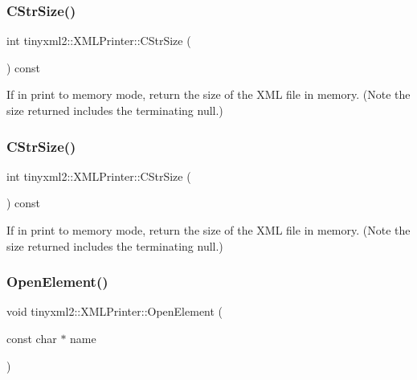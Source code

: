 \subsubsection{\texorpdfstring{C\+Str\+Size()}{CStrSize()}\hspace{0.1cm}{\footnotesize\ttfamily [1/2]}}
{\footnotesize\ttfamily int tinyxml2\+::\+X\+M\+L\+Printer\+::\+C\+Str\+Size (\begin{DoxyParamCaption}{ }\end{DoxyParamCaption}) const\hspace{0.3cm}{\ttfamily [inline]}}

If in print to memory mode, return the size of the X\+ML file in memory. (Note the size returned includes the terminating null.) \mbox{\label{classtinyxml2_1_1XMLPrinter_a3256cf3523d4898b91abb18b924be04c}} 
\subsubsection{\texorpdfstring{C\+Str\+Size()}{CStrSize()}\hspace{0.1cm}{\footnotesize\ttfamily [2/2]}}
{\footnotesize\ttfamily int tinyxml2\+::\+X\+M\+L\+Printer\+::\+C\+Str\+Size (\begin{DoxyParamCaption}{ }\end{DoxyParamCaption}) const\hspace{0.3cm}{\ttfamily [inline]}}

If in print to memory mode, return the size of the X\+ML file in memory. (Note the size returned includes the terminating null.) \mbox{\label{classtinyxml2_1_1XMLPrinter_aa10d330818dbc31b44e9ffc27618bdfb}} 
\subsubsection{\texorpdfstring{Open\+Element()}{OpenElement()}\hspace{0.1cm}{\footnotesize\ttfamily [1/2]}}
{\footnotesize\ttfamily void tinyxml2\+::\+X\+M\+L\+Printer\+::\+Open\+Element (\begin{DoxyParamCaption}\item[{const char $\ast$}]{name }\end{DoxyParamCaption})}


